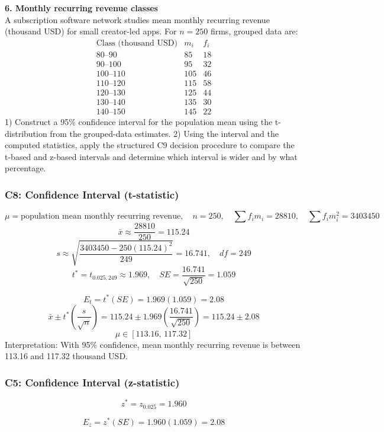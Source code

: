 \begin{ExamProblems}
		\newpage
		\item
		\textbf{6. Monthly recurring revenue classes}\\
		A subscription software network studies mean monthly recurring revenue (thousand USD) for small creator-led apps.
		For $n=250$ firms, grouped data are:
		\[
		\begin{array}{c|c|c}
		\text{Class (thousand USD)} & m_i & f_i\\\hline
		80\text{--}90 & 85 & 18\\
		90\text{--}100 & 95 & 32\\
		100\text{--}110 & 105 & 46\\
		110\text{--}120 & 115 & 58\\
		120\text{--}130 & 125 & 44\\
		130\text{--}140 & 135 & 30\\
		140\text{--}150 & 145 & 22
		\end{array}
		\]
		1) Construct a 95\% confidence interval for the population mean using the t-distribution from the grouped-data estimates.
		2) Using the interval and the computed statistics, apply the structured C9 decision procedure to compare the t-based and z-based intervals and determine which interval is wider and by what percentage.

		\subsubsection*{C8: Confidence Interval (t-statistic)}
		\[
		\mu=\text{population mean monthly recurring revenue},\quad n=250,\quad \sum f_im_i=28810,\quad \sum f_im_i^2=3403450
		\]
		\[
		\bar{x}\approx\frac{28810}{250}=115.24
		\]
		\[
		s\approx\sqrt{\frac{3403450-250(115.24)^2}{249}}=16.741,\quad df=249
		\]
		\[
		t^*=t_{0.025,249}\approx 1.969,\quad SE=\frac{16.741}{\sqrt{250}}=1.059
		\]

		\[
		E_t=t^*(SE)=1.969(1.059)=2.08
		\]
		\[
		\bar{x}\pm t^*\left(\frac{s}{\sqrt{n}}\right)=115.24\pm 1.969\left(\frac{16.741}{\sqrt{250}}\right)=115.24\pm 2.08
		\]
		\[
		\mu\in[113.16,\,117.32]
		\]
		Interpretation: With 95\% confidence, mean monthly recurring revenue is between 113.16 and 117.32 thousand USD.

		\subsubsection*{C5: Confidence Interval (z-statistic)}
		\[
		z^*=z_{0.025}=1.960
		\]

		\[
		E_z=z^*(SE)=1.960(1.059)=2.08
		\]


\end{ExamProblems}
